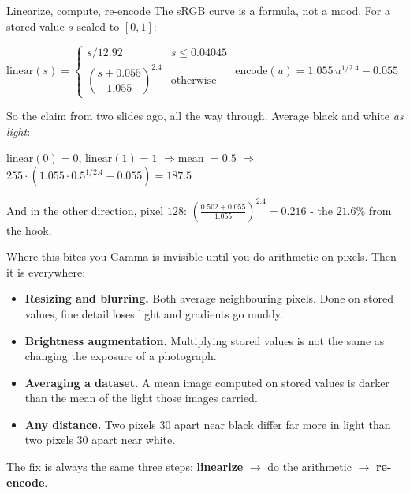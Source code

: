\documentclass[aspectratio=169]{beamer}
\begin{document}
\begin{frame}{Linearize, compute, re-encode}
  \small
  The sRGB curve is a formula, not a mood. For a stored value $s$ scaled to $[0,1]$:
  \vskip 4pt
  \begin{center}\footnotesize
    $\text{linear}(s) = \begin{cases}
      s/12.92 & s \le 0.04045\\[3pt]
      \left(\dfrac{s + 0.055}{1.055}\right)^{2.4} & \text{otherwise}
    \end{cases}$
    \qquad
    $\text{encode}(u) = 1.055\, u^{1/2.4} - 0.055$
  \end{center}
  \vskip 6pt
  So the claim from two slides ago, all the way through. Average black and white
  \emph{as light}:
  \vskip 3pt
  \begin{center}\footnotesize
    $\text{linear}(0) = 0$, \quad $\text{linear}(1) = 1$
    \quad$\Rightarrow$\quad mean $= 0.5$
    \quad$\Rightarrow$\quad
    $255 \cdot \left(1.055 \cdot 0.5^{1/2.4} - 0.055\right) = \mathbf{187.5}$
  \end{center}
  \vskip 4pt
  And in the other direction, pixel $128$:
  $\left(\frac{0.502 + 0.055}{1.055}\right)^{2.4} = \mathbf{0.216}$ - the $21.6\%$ from the
  hook.
  \vskip 6pt
\end{frame}

\begin{frame}{Where this bites you}
  \small
  Gamma is invisible until you do arithmetic on pixels. Then it is everywhere:
  \vskip 6pt
  \begin{itemize}\small
    \item \textbf{Resizing and blurring.} Both average neighbouring pixels. Done on stored
      values, fine detail loses light and gradients go muddy.
    \item \textbf{Brightness augmentation.} Multiplying stored values is not the same as
      changing the exposure of a photograph.
    \item \textbf{Averaging a dataset.} A mean image computed on stored values is darker
      than the mean of the light those images carried.
    \item \textbf{Any distance.} Two pixels $30$ apart near black differ far more in light
      than two pixels $30$ apart near white.
  \end{itemize}
  \vskip 6pt
  The fix is always the same three steps: \textbf{linearize} $\to$ do the arithmetic
  $\to$ \textbf{re-encode}.
  \vskip 6pt
\end{frame}
\end{document}
